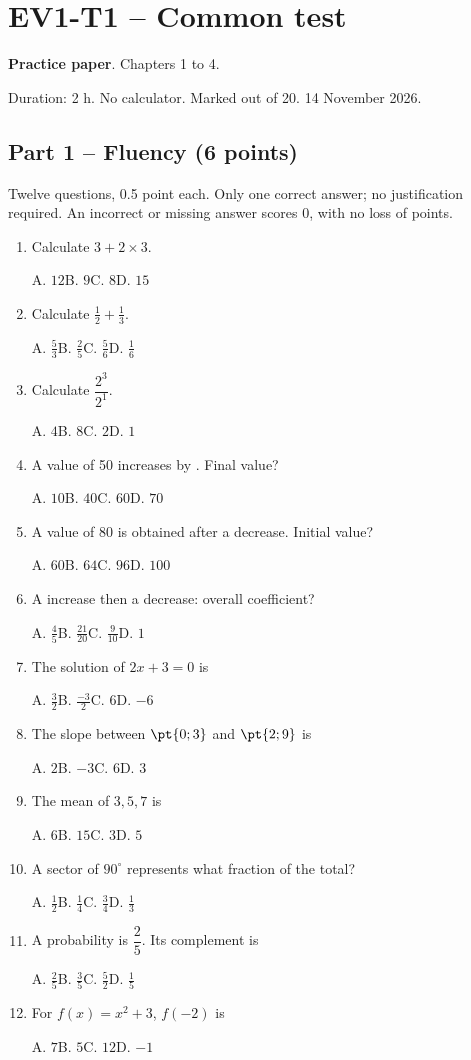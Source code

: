 \mxnewpage\section*{EV1-T1 -- Common test}\label{EV1-T1}
\textbf{Practice paper}. Chapters 1 to 4.\par Duration: 2 h. No calculator. Marked out of 20. 14 November 2026.
\subsection*{Part 1 -- Fluency (6 points)}
Twelve questions, \num{0,5} point each. Only one correct answer; no justification required. An incorrect or missing answer scores 0, with no loss of points.
\begin{enumerate}
\item Calculate $3+2\times3$.\par A. $12$\quad B. $9$\quad C. $8$\quad D. $15$
\item Calculate $\frac12+\frac13$.\par A. $\frac{5}{3}$\quad B. $\frac{2}{5}$\quad C. $\frac{5}{6}$\quad D. $\frac{1}{6}$
\item Calculate $\dfrac{2^3}{2^{1}}$.\par A. $4$\quad B. $8$\quad C. $2$\quad D. $1$
\item A value of 50 increases by . Final value?\par A. $10$\quad B. $40$\quad C. $60$\quad D. $70$
\item A value of 80 is obtained after a  decrease. Initial value?\par A. $60$\quad B. $64$\quad C. $96$\quad D. $100$
\item A  increase then a  decrease: overall coefficient?\par A. $\frac{4}{5}$\quad B. $\frac{21}{20}$\quad C. $\frac{9}{10}$\quad D. $1$
\item The solution of $2x+3=0$ is\par A. $\frac{3}{2}$\quad B. $\frac{-3}{2}$\quad C. $6$\quad D. $-6$
\item The slope between $\pt{0;3}$ and $\pt{2;9}$ is\par A. $2$\quad B. $-3$\quad C. $6$\quad D. $3$
\item The mean of $3, 5, 7$ is\par A. $6$\quad B. $15$\quad C. $3$\quad D. $5$
\item A sector of $90^\circ$ represents what fraction of the total?\par A. $\frac{1}{2}$\quad B. $\frac{1}{4}$\quad C. $\frac{3}{4}$\quad D. $\frac{1}{3}$
\item A probability is $\dfrac{2}{5}$. Its complement is\par A. $\frac{2}{5}$\quad B. $\frac{3}{5}$\quad C. $\frac{5}{2}$\quad D. $\frac{1}{5}$
\item For $f(x)=x^2+3$, $f(-2)$ is\par A. $7$\quad B. $5$\quad C. $12$\quad D. $-1$
\end{enumerate}
